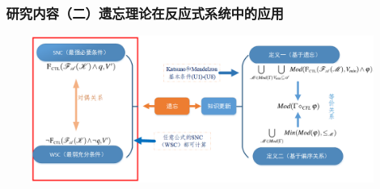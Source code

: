 \documentclass[aspectratio=1610, 9pt, CJK]{beamer}
\begin{document}
\begin{frame}
\frametitle{~研究内容（二）遗忘理论在反应式系统中的应用}
\begin{figure} 
	\includegraphics[scale=0.4]{figures/sncAndWsc11}
\end{figure} 

\end{frame}
\end{document}
